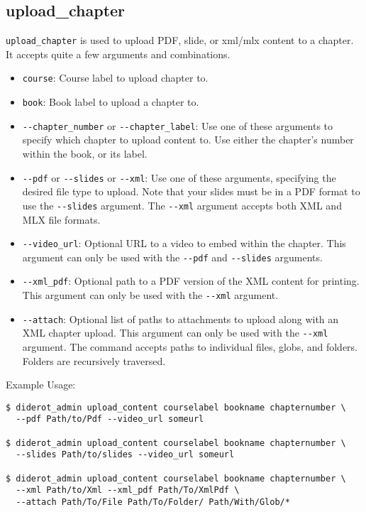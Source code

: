 \subsection{upload\_chapter}

\verb|upload_chapter| is used to upload PDF, slide, or xml/mlx content to a chapter.
%
It accepts quite a few arguments and combinations.

\begin{itemize}
  \item \verb|course|: Course label to upload chapter to.
  \item \verb|book|: Book label to upload a chapter to.

  \item \verb|--chapter_number| or \verb|--chapter_label|: Use one of these arguments to specify which chapter to upload content to. Use either the chapter's number within the book, or its label.

  \item \verb|--pdf| or \verb|--slides| or \verb|--xml|: Use one of these arguments, specifying the desired file type to upload. Note that your slides must be in a PDF format to use the \verb|--slides| argument. The \verb|--xml| argument accepts both XML and MLX file formats.

  \item \verb|--video_url|: Optional URL to a video to embed within the chapter. This argument can only be used with the \verb|--pdf| and \verb|--slides| arguments.

  \item \verb|--xml_pdf|: Optional path to a PDF version of the XML content for printing. This argument can only be used with the \verb|--xml| argument.

  \item \verb|--attach|: Optional list of paths to attachments to upload along with an XML chapter upload. This argument can only be used with the \verb|--xml| argument. The command accepts paths to individual files, globs, and folders. Folders are recursively traversed.
\end{itemize}

Example Usage:
\begin{verbatim}
$ diderot_admin upload_content courselabel bookname chapternumber \
  --pdf Path/to/Pdf --video_url someurl

$ diderot_admin upload_content courselabel bookname chapternumber \
  --slides Path/to/slides --video_url someurl

$ diderot_admin upload_content courselabel bookname chapternumber \
  --xml Path/to/Xml --xml_pdf Path/To/XmlPdf \
  --attach Path/To/File Path/To/Folder/ Path/With/Glob/*
\end{verbatim}

